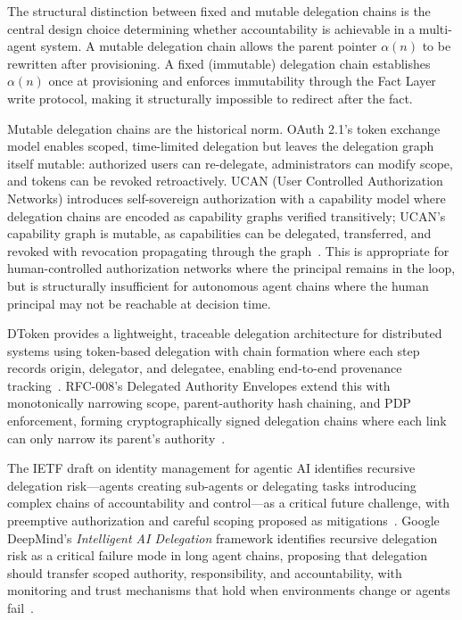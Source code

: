 The structural distinction between fixed and mutable delegation chains is the central design choice determining whether accountability is achievable in a multi-agent system. A mutable delegation chain allows the parent pointer $\alpha(n)$ to be rewritten after provisioning. A fixed (immutable) delegation chain establishes $\alpha(n)$ once at provisioning and enforces immutability through the Fact Layer write protocol, making it structurally impossible to redirect after the fact.

Mutable delegation chains are the historical norm. OAuth 2.1's token exchange model enables scoped, time-limited delegation but leaves the delegation graph itself mutable: authorized users can re-delegate, administrators can modify scope, and tokens can be revoked retroactively. UCAN (User Controlled Authorization Networks) introduces self-sovereign authorization with a capability model where delegation chains are encoded as capability graphs verified transitively; UCAN's capability graph is mutable, as capabilities can be delegated, transferred, and revoked with revocation propagating through the graph~\cite{UCAN}. This is appropriate for human-controlled authorization networks where the principal remains in the loop, but is structurally insufficient for autonomous agent chains where the human principal may not be reachable at decision time.

DToken provides a lightweight, traceable delegation architecture for distributed systems using token-based delegation with chain formation where each step records origin, delegator, and delegatee, enabling end-to-end provenance tracking~\cite{dtoken2025}. RFC-008's Delegated Authority Envelopes extend this with monotonically narrowing scope, parent-authority hash chaining, and PDP enforcement, forming cryptographically signed delegation chains where each link can only narrow its parent's authority~\cite{capisco-rfc008}.

The IETF draft on identity management for agentic AI identifies recursive delegation risk---agents creating sub-agents or delegating tasks introducing complex chains of accountability and control---as a critical future challenge, with preemptive authorization and careful scoping proposed as mitigations~\cite{openid-agentic-ai}. Google DeepMind's \emph{Intelligent AI Delegation} framework identifies recursive delegation risk as a critical failure mode in long agent chains, proposing that delegation should transfer scoped authority, responsibility, and accountability, with monitoring and trust mechanisms that hold when environments change or agents fail~\cite{intelligent-delegation}.

